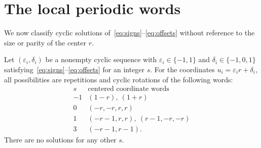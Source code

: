 \section{The local periodic words}
\label{sec:local}

We now classify cyclic solutions of~\eqref{eq:signs}--\eqref{eq:offsets}
without reference to the size or parity of the center \(r\).

\begin{lemma}
\label{lem:symbol_classification}
Let \((\varepsilon_i,\delta_i)\) be a nonempty cyclic sequence with
\(\varepsilon_i\in\{-1,1\}\) and \(\delta_i\in\{-1,0,1\}\)
satisfying~\eqref{eq:signs}--\eqref{eq:offsets} for an integer \(s\).
For the coordinates \(u_i=\varepsilon_i r+\delta_i\), all possibilities
are repetitions and cyclic rotations of the following words:
\begin{equation}
 \begin{array}{c|l}
 s & \text{centered coordinate words}\\ \hline
 -1 &(1-r),\ (1+r)\\
 0 &(-r,-r,r,r)\\
 1 &(-r-1,r,r),\ (r-1,-r,-r)\\
 3 &(-r-1,r-1).
 \end{array}
 \label{eq:centered_words}
\end{equation}
There are no solutions for any other \(s\).
\end{lemma}
